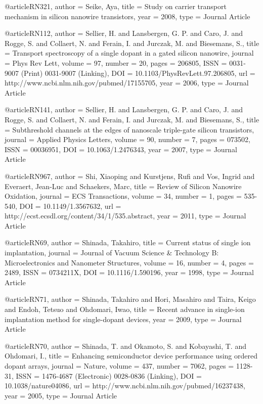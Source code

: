 @article{RN321,
   author = {Seike, Aya},
   title = {Study on carrier transport mechanism in silicon nanowire transistors},
   year = {2008},
   type = {Journal Article}
}

@article{RN112,
   author = {Sellier, H. and Lansbergen, G. P. and Caro, J. and Rogge, S. and Collaert, N. and Ferain, I. and Jurczak, M. and Biesemans, S.},
   title = {Transport spectroscopy of a single dopant in a gated silicon nanowire},
   journal = {Phys Rev Lett},
   volume = {97},
   number = {20},
   pages = {206805},
   ISSN = {0031-9007 (Print)
0031-9007 (Linking)},
   DOI = {10.1103/PhysRevLett.97.206805},
   url = {http://www.ncbi.nlm.nih.gov/pubmed/17155705},
   year = {2006},
   type = {Journal Article}
}

@article{RN141,
   author = {Sellier, H. and Lansbergen, G. P. and Caro, J. and Rogge, S. and Collaert, N. and Ferain, I. and Jurczak, M. and Biesemans, S.},
   title = {Subthreshold channels at the edges of nanoscale triple-gate silicon transistors},
   journal = {Applied Physics Letters},
   volume = {90},
   number = {7},
   pages = {073502},
   ISSN = {00036951},
   DOI = {10.1063/1.2476343},
   year = {2007},
   type = {Journal Article}
}

@article{RN967,
   author = {Shi, Xiaoping and Kurstjens, Rufi and Vos, Ingrid and Everaert, Jean-Luc and Schaekers, Marc},
   title = {Review of Silicon Nanowire Oxidation},
   journal = {ECS Transactions},
   volume = {34},
   number = {1},
   pages = {535-540},
   DOI = {10.1149/1.3567632},
   url = {http://ecst.ecsdl.org/content/34/1/535.abstract},
   year = {2011},
   type = {Journal Article}
}

@article{RN69,
   author = {Shinada, Takahiro},
   title = {Current status of single ion implantation},
   journal = {Journal of Vacuum Science & Technology B: Microelectronics and Nanometer Structures},
   volume = {16},
   number = {4},
   pages = {2489},
   ISSN = {0734211X},
   DOI = {10.1116/1.590196},
   year = {1998},
   type = {Journal Article}
}

@article{RN71,
   author = {Shinada, Takahiro and Hori, Masahiro and Taira, Keigo and Endoh, Tetsuo and Ohdomari, Iwao},
   title = {Recent advance in single-ion implantation method for single-dopant devices},
   year = {2009},
   type = {Journal Article}
}

@article{RN70,
   author = {Shinada, T. and Okamoto, S. and Kobayashi, T. and Ohdomari, I.},
   title = {Enhancing semiconductor device performance using ordered dopant arrays},
   journal = {Nature},
   volume = {437},
   number = {7062},
   pages = {1128-31},
   ISSN = {1476-4687 (Electronic)
0028-0836 (Linking)},
   DOI = {10.1038/nature04086},
   url = {http://www.ncbi.nlm.nih.gov/pubmed/16237438},
   year = {2005},
   type = {Journal Article}
}


